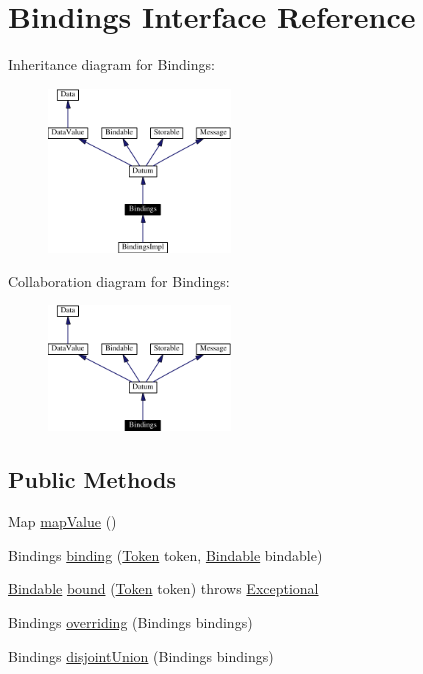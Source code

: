 \hypertarget{interfaceBindings}{
\section{Bindings  Interface Reference}
\label{interfaceBindings}
}
Inheritance diagram for Bindings:\begin{figure}[H]
\begin{center}
\leavevmode
\includegraphics[width=137pt]{interfaceBindings__inherit__graph}
\end{center}
\end{figure}
Collaboration diagram for Bindings:\begin{figure}[H]
\begin{center}
\leavevmode
\includegraphics[width=137pt]{interfaceBindings__coll__graph}
\end{center}
\end{figure}
\subsection*{Public Methods}
\begin{CompactItemize}
\item 
Map \hyperlink{interfaceBindings_a0}{map\-Value} ()
\item 
Bindings \hyperlink{interfaceBindings_a1}{binding} (\hyperlink{interfaceToken}{Token} token, \hyperlink{interfaceBindable}{Bindable} bindable)
\item 
\hyperlink{interfaceBindable}{Bindable} \hyperlink{interfaceBindings_a2}{bound} (\hyperlink{interfaceToken}{Token} token) throws \hyperlink{classExceptional}{Exceptional}
\item 
Bindings \hyperlink{interfaceBindings_a3}{overriding} (Bindings bindings)
\item 
Bindings \hyperlink{interfaceBindings_a4}{disjoint\-Union} (Bindings bindings)
\end{CompactItemize}



